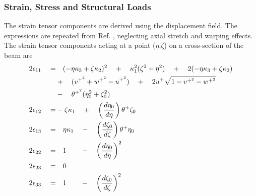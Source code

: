 \subsubsection{Strain, Stress and Structural Loads}
The strain tensor components are derived using the displacement field. The expressions are repeated from Ref. \cite{HodgesDowell1}, neglecting axial stretch and warping effects. The strain tensor components acting at a point ($\eta$,$\zeta$) on a cross-section of the beam are 
\begin{align}
\label{eqn:strains1}
2 \epsilon_{11} \quad = & \quad (-\eta \kappa_3 + \zeta \kappa_2)^2 \quad + \quad \kappa_1^2 (\zeta^2 + \eta^2) \quad + \quad 2(-\eta \kappa_3 + \zeta \kappa_2) \notag\\
& + \quad (v^{+^2} + w^{+^2} - u^{+^2}) \quad + \quad 2 u^+ \sqrt{1 - v^{+^2} - w^{+^2}} \notag \\
& - \quad \theta^{+^2} (\eta_0^2 + \zeta_0^2) \\
2 \epsilon_{12} \quad = & -\zeta \kappa_1 \quad + \quad \left(\frac{d \eta_0}{d \eta}\right) \theta^{+}  \zeta_0 \notag \\
2 \epsilon_{13} \quad = & \quad \eta \kappa_1 \quad - \quad \left(\frac{d \zeta_0}{d \zeta}\right) \theta^{+} \eta_0 \notag \\
2 \epsilon_{22} \quad = & \quad 1 \qquad - \quad \left(\frac{d \eta_0}{d \eta}\right)^2 \notag \\
2 \epsilon_{23} \quad = & \quad 0 \notag \\
2 \epsilon_{33} \quad = & \quad 1 \qquad - \quad \left(\frac{d \zeta_0}{d \zeta}\right)^2 \notag
\end{align}

